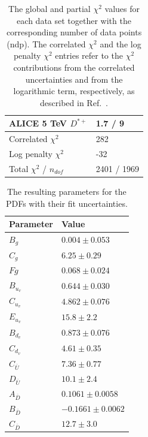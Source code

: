 \documentclass[12pt]{article}
\begin{document}
\begin{table}
\begin{tabular}{ll}
    ALICE 5 TeV $D^{*+}$ & 1.7 / 9  \\ 
    \hline
    Correlated $\chi^2$  & 282  \\ 
    Log penalty $\chi^2$  &  -32  \\ 
    \hline
    Total $\chi^2$ / $n_{dof}$  & 2401 / 1969  \\ 
\end{tabular}
\caption{The global and partial $\chi^2$ values for each data set together with the corresponding number of data points (ndp). The correlated $\chi^2$ and the log penalty $\chi^2$ entries refer to the $\chi^2$ contributions from the correlated uncertainties and from the logarithmic term, respectively, as described in Ref.~\cite{Abramowicz:2015mha}.}
\label{tab:chi}
\end{table}

\begin{table}
    \renewcommand*{\arraystretch}{1.12}
    \centering
\begin{tabular}{ll}
    Parameter & Value \\
    \hline
    $B_g$ & $0.004 \pm 0.053$  \\
    $C_g$ & $6.25 \pm 0.29$  \\
    $Fg$ & $0.068 \pm 0.024$  \\
    $B_{u_v}$ & $0.644 \pm 0.030$  \\
    $C_{u_v}$ & $4.862 \pm 0.076$  \\
    $E_{u_v}$ & $15.8 \pm 2.2$  \\
    $B_{d_v}$ & $0.873 \pm 0.076$  \\
    $C_{d_v}$ & $4.61 \pm 0.35$  \\
    $C_{\overline{U}}$ & $7.36 \pm 0.77$  \\
    $D_{\overline{U}}$ & $10.1 \pm 2.4$  \\
    $A_{\overline{D}}$ & $0.1061 \pm 0.0058$  \\
    $B_{\overline{D}}$ & $-0.1661 \pm 0.0062$  \\
    $C_{\overline{D}}$ & $12.7 \pm 3.0$  \\
\end{tabular}
\caption{The resulting parameters for the PDFs with their fit uncertainties.}
\label{tab:pars}
\end{table}
\end{document}
